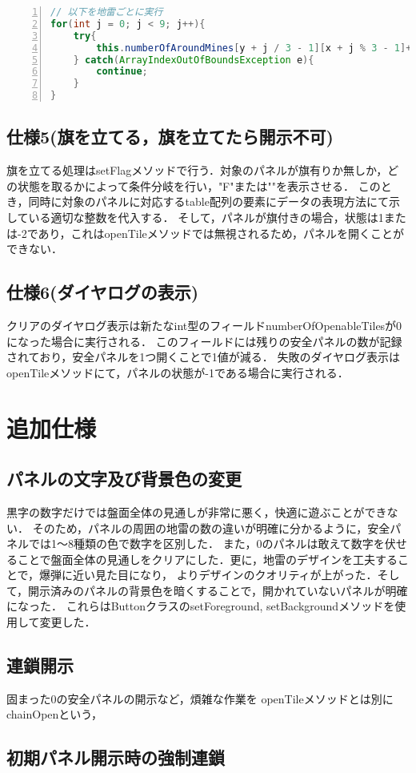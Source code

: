 \documentclass{jlreq}
\begin{document}
\begin{lstlisting}[caption=Javaソースコード,label=code:countMines,language=java,frame={tb},breaklines=true,lineskip=-0.5ex,numbers=left,stringstyle={\small\ttfamily}]
// 以下を地雷ごとに実行
for(int j = 0; j < 9; j++){
    try{
        this.numberOfAroundMines[y + j / 3 - 1][x + j % 3 - 1]++;
    } catch(ArrayIndexOutOfBoundsException e){
        continue;
    }
}
\end{lstlisting}

\subsection{仕様5(旗を立てる，旗を立てたら開示不可)}
旗を立てる処理はsetFlagメソッドで行う．対象のパネルが旗有りか無しか，どの状態を取るかによって条件分岐を行い，"F"または""を表示させる．
このとき，同時に対象のパネルに対応するtable配列の要素にデータの表現方法にて示している適切な整数を代入する．
そして，パネルが旗付きの場合，状態は1または-2であり，これはopenTileメソッドでは無視されるため，パネルを開くことができない．

\subsection{仕様6(ダイヤログの表示)}
クリアのダイヤログ表示は新たなint型のフィールドnumberOfOpenableTilesが0になった場合に実行される．
このフィールドには残りの安全パネルの数が記録されており，安全パネルを1つ開くことで1値が減る．
失敗のダイヤログ表示はopenTileメソッドにて，パネルの状態が-1である場合に実行される．

\section{追加仕様}
\subsection{パネルの文字及び背景色の変更}
黒字の数字だけでは盤面全体の見通しが非常に悪く，快適に遊ぶことができない．
そのため，パネルの周囲の地雷の数の違いが明確に分かるように，安全パネルでは1～8種類の色で数字を区別した．
また，0のパネルは敢えて数字を伏せることで盤面全体の見通しをクリアにした．更に，地雷のデザインを工夫することで，爆弾に近い見た目になり，
よりデザインのクオリティが上がった．そして，開示済みのパネルの背景色を暗くすることで，開かれていないパネルが明確になった．
これらはButtonクラスのsetForeground, setBackgroundメソッドを使用して変更した．

\subsection{連鎖開示}
固まった0の安全パネルの開示など，煩雑な作業を
openTileメソッドとは別にchainOpenという，

\subsection{初期パネル開示時の強制連鎖}
\end{document}
